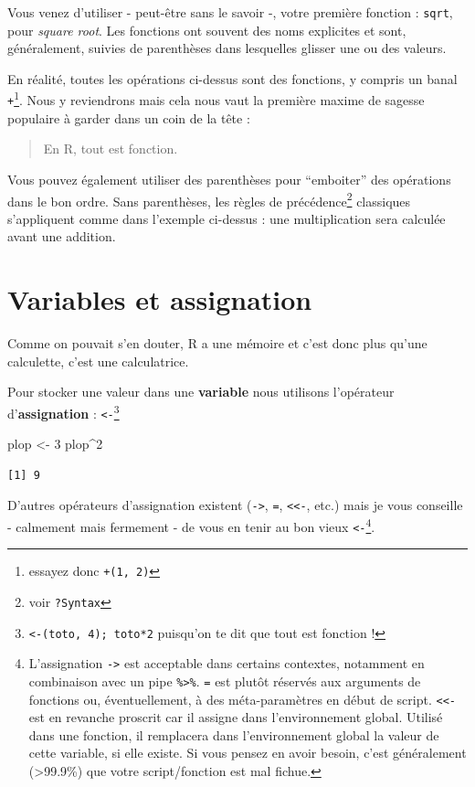 \documentclass[
  letterpaper,
  DIV=11,
  numbers=noendperiod]{scrreprt}
\newenvironment{Shaded}{\begin{snugshade}}{\end{snugshade}}
\newcommand{\DecValTok}[1]{\textcolor[rgb]{0.68,0.00,0.00}{#1}}
\newcommand{\NormalTok}[1]{\textcolor[rgb]{0.00,0.23,0.31}{#1}}
\newcommand{\OtherTok}[1]{\textcolor[rgb]{0.00,0.23,0.31}{#1}}
\newcommand{\SpecialCharTok}[1]{\textcolor[rgb]{0.37,0.37,0.37}{#1}}
\begin{document}
Vous venez d'utiliser - peut-être sans le savoir -, votre première
fonction : \texttt{sqrt}, pour \emph{square root}. Les fonctions ont
souvent des noms explicites et sont, généralement, suivies de
parenthèses dans lesquelles glisser une ou des valeurs.

En réalité, toutes les opérations ci-dessus sont des fonctions, y
compris un banal \texttt{+}\footnote{essayez donc
  \texttt{\textasciigrave{}+\textasciigrave{}(1,\ 2)}}. Nous y
reviendrons mais cela nous vaut la première maxime de sagesse populaire
à garder dans un coin de la tête :

\begin{quote}
En R, tout est fonction.
\end{quote}

Vous pouvez également utiliser des parenthèses pour ``emboiter'' des
opérations dans le bon ordre. Sans parenthèses, les règles de
précédence\footnote{voir \texttt{?Syntax}} classiques s'appliquent comme
dans l'exemple ci-dessus : une multiplication sera calculée avant une
addition.

\hypertarget{variables-et-assignation}{%
\section{Variables et assignation}\label{variables-et-assignation}}

Comme on pouvait s'en douter, R a une mémoire et c'est donc plus qu'une
calculette, c'est une calculatrice.

Pour stocker une valeur dans une \textbf{variable} nous utilisons
l'opérateur d'\textbf{assignation} : \texttt{\textless{}-}\footnote{\texttt{\textasciigrave{}\textless{}-\textasciigrave{}(toto,\ 4);\ toto*2}
  puisqu'on te dit que tout est fonction !}

\begin{Shaded}
\begin{Highlighting}[]
\NormalTok{plop }\OtherTok{\textless{}{-}} \DecValTok{3}
\NormalTok{plop}\SpecialCharTok{\^{}}\DecValTok{2}
\end{Highlighting}
\end{Shaded}

\begin{verbatim}
[1] 9
\end{verbatim}

D'autres opérateurs d'assignation existent (\texttt{-\textgreater{}},
\texttt{=}, \texttt{\textless{}\textless{}-}, etc.) mais je vous
conseille - calmement mais fermement - de vous en tenir au bon vieux
\texttt{\textless{}-}\footnote{L'assignation \texttt{-\textgreater{}}
  est acceptable dans certains contextes, notamment en combinaison avec
  un pipe \texttt{\%\textgreater{}\%}. \texttt{=} est plutôt réservés
  aux arguments de fonctions ou, éventuellement, à des méta-paramètres
  en début de script. \texttt{\textless{}\textless{}-} est en revanche
  proscrit car il assigne dans l'environnement global. Utilisé dans une
  fonction, il remplacera dans l'environnement global la valeur de cette
  variable, si elle existe. Si vous pensez en avoir besoin, c'est
  généralement (\textgreater99.9\%) que votre script/fonction est mal
  fichue.}.
\end{document}
